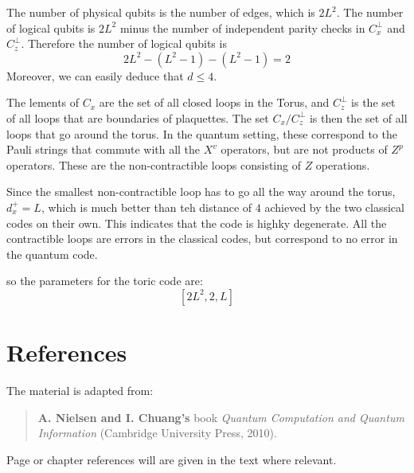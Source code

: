 \documentclass[11pt,a4paper]{article}
\theoremstyle{definition}
\theoremstyle{plain}
\theoremstyle{remark}
\begin{document}
The number of physical qubits is the number of edges, which is $2L^2$. The number of logical qubits is $2L^2$ minus 
the number of independent parity checks in $C_x^\perp$ and $C_z^\perp$. Therefore the number of logical qubits is 
$$2 L^2 - (L^2 - 1) - (L^2 - 1) = 2$$
Moreover, we can easily deduce that $d \leq 4$. 

The lements of $C_x$ are the set of all closed loops in the Torus, and $C_z^\perp$ is the set 
of all loops that are boundaries of plaquettes. The set $C_x / C_z^\perp$ is then the set of all 
loops that go around the torus. In the quantum setting, these correspond to the Pauli strings that commute with 
all the $X^v$ operators, but are not products of $Z^p$ operators. These are the non-contractible loops 
consisting of $Z$ operations. 

Since the smallest non-contractible loop has to go all the way around the torus, $d_x^+ = L$, which 
is much better than teh distance of $4$ achieved by the two classical codes on their own. This indicates that 
the code is highky degenerate. All the contractible loops are errors in the classical codes, but correspond to no error 
in the quantum code. 

so the parameters for the toric code are: 
$$[2L^2, 2, L]$$

\section{References}
The material is adapted from: 
\begin{quote}
\textbf{A. Nielsen and I. Chuang's} book \emph{Quantum Computation and Quantum Information} (Cambridge University Press, 2010).
\end{quote}
Page or chapter references will are given in the text where relevant. 
\end{document}
